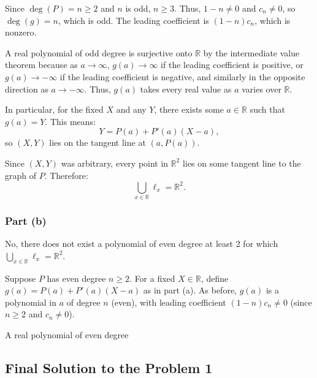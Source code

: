 \documentclass[12pt,a4paper]{article}
\theoremstyle{definition}
\begin{document}
    Since $\deg(P) = n \geq 2$ and $n$ is odd, $n \geq 3$. Thus, $1 - n \neq 0$ and $c_n \neq 0$, so $\deg(g) = n$, which is odd. The leading coefficient is $(1 - n) c_n$, which is nonzero.

    A real polynomial of odd degree is surjective onto $\mathbb{R}$ by the intermediate value theorem because as $a \to \infty$, $g(a) \to \infty$ if the leading coefficient is positive, or $g(a) \to -\infty$ if the leading coefficient is negative, and similarly in the opposite direction as $a \to -\infty$. Thus, $g(a)$ takes every real value as $a$ varies over $\mathbb{R}$.

    In particular, for the fixed $X$ and any $Y$, there exists some $a \in \mathbb{R}$ such that $g(a) = Y$. This means:
    \[
        Y = P(a) + P'(a)(X - a),
    \]
    so $(X, Y)$ lies on the tangent line at $(a, P(a))$.

    Since $(X, Y)$ was arbitrary, every point in $\mathbb{R}^2$ lies on some tangent line to the graph of $P$. Therefore:
    \[
        \bigcup_{x \in \mathbb{R}} \ell_x = \mathbb{R}^2.
    \]

    \subsubsection*{Part (b)}
    No, there does not exist a polynomial of even degree at least 2 for which $\bigcup_{x \in \mathbb{R}} \ell_x = \mathbb{R}^2$.

    Suppose $P$ has even degree $n \geq 2$. For a fixed $X \in \mathbb{R}$, define $g(a) = P(a) + P'(a)(X - a)$ as in part (a). As before, $g(a)$ is a polynomial in $a$ of degree $n$ (even), with leading coefficient $(1 - n) c_n \neq 0$ (since $n \geq 2$ and $c_n \neq 0$).

    A real polynomial of even degree

    \subsection{Final Solution to the Problem 1}
\end{document}
